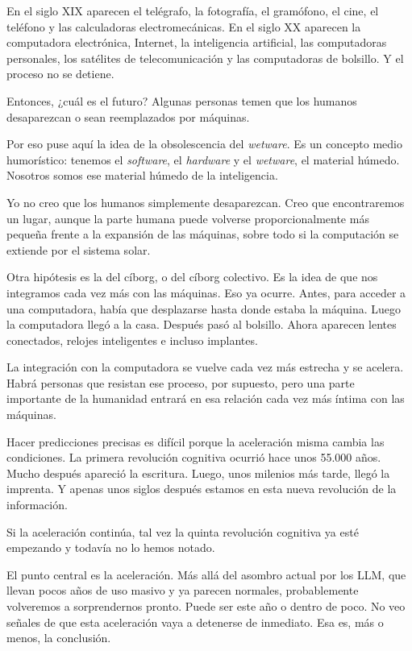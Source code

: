 \documentclass[12pt, letterpaper]{article}
\begin{document}
En el siglo XIX aparecen el telégrafo, la fotografía, el gramófono, el cine, el teléfono y las calculadoras electromecánicas. En el siglo XX aparecen la computadora electrónica, Internet, la inteligencia artificial, las computadoras personales, los satélites de telecomunicación y las computadoras de bolsillo. Y el proceso no se detiene.

Entonces, ¿cuál es el futuro? Algunas personas temen que los humanos desaparezcan o sean reemplazados por máquinas.

Por eso puse aquí la idea de la obsolescencia del \textit{wetware}. Es un concepto medio humorístico: tenemos el \textit{software}, el \textit{hardware} y el \textit{wetware}, el material húmedo. Nosotros somos ese material húmedo de la inteligencia.

Yo no creo que los humanos simplemente desaparezcan. Creo que encontraremos un lugar, aunque la parte humana puede volverse proporcionalmente más pequeña frente a la expansión de las máquinas, sobre todo si la computación se extiende por el sistema solar.

Otra hipótesis es la del cíborg, o del cíborg colectivo. Es la idea de que nos integramos cada vez más con las máquinas. Eso ya ocurre. Antes, para acceder a una computadora, había que desplazarse hasta donde estaba la máquina. Luego la computadora llegó a la casa. Después pasó al bolsillo. Ahora aparecen lentes conectados, relojes inteligentes e incluso implantes.

La integración con la computadora se vuelve cada vez más estrecha y se acelera. Habrá personas que resistan ese proceso, por supuesto, pero una parte importante de la humanidad entrará en esa relación cada vez más íntima con las máquinas.

Hacer predicciones precisas es difícil porque la aceleración misma cambia las condiciones. La primera revolución cognitiva ocurrió hace unos 55.000 años. Mucho después apareció la escritura. Luego, unos milenios más tarde, llegó la imprenta. Y apenas unos siglos después estamos en esta nueva revolución de la información.

Si la aceleración continúa, tal vez la quinta revolución cognitiva ya esté empezando y todavía no lo hemos notado.

El punto central es la aceleración. Más allá del asombro actual por los LLM, que llevan pocos años de uso masivo y ya parecen normales, probablemente volveremos a sorprendernos pronto. Puede ser este año o dentro de poco. No veo señales de que esta aceleración vaya a detenerse de inmediato. Esa es, más o menos, la conclusión.
\end{document}
